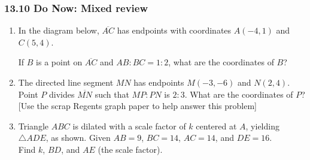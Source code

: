 \documentclass[12pt, twoside]{article}
\begin{document}
\subsubsection*{13.10 Do Now: Mixed review}
 \begin{enumerate}

  \item In the diagram below, $\overline{AC}$ has endpoints with coordinates $A(-4,1)$ and $C(5,4)$.
   \begin{center} %
   \end{center}
   If $B$ is a point on $\overline{AC}$ and $AB{:}BC = 1{:}2$,  what  are  the coordinates of $B$? \vspace{4cm}

   \item The directed line segment $MN$ has endpoints $M(-3,-6)$ and $N(2,4)$. Point $P$ divides $\overline{MN}$ such that $MP {:}PN$ is $2{:}3$. What are the coordinates of $P$?\\[0.25cm]
   [Use the scrap Regents graph paper to help answer this problem] \vspace{4cm}

\newpage
  \item Triangle $ABC$ is dilated with a scale factor of $k$ centered at $A$, yielding $\triangle ADE$, as shown. Given $AB=9$, $BC=14$, $AC=14$, and $DE=16$. \\[0.25cm] Find $k$, $BD$, and $AE$ (the scale factor).\\[0.25cm]
  \vspace{4cm}


\end{enumerate}
\end{document}
